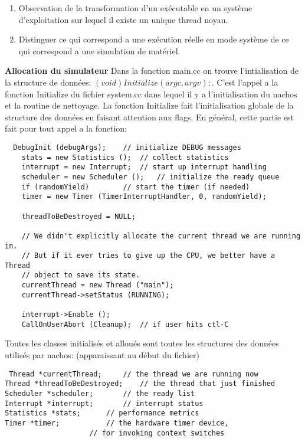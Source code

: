 \documentclass[a4paper,10pt]{article}
\begin{document}
\begin{enumerate}
 \item Observation de la transformation d'un exécutable en un système
d'exploitation sur lequel il existe un unique thread noyau.

 \item Distinguer ce qui correspond a une exécution réelle en mode système
de ce qui correspond a une simulation de matériel.
\end{enumerate}


\textbf{Allocation du simulateur} Dans la fonction main.cc on trouve
l'intialisation de la structure de données: $ (void) Initialize (argc, argv);$.
C'est l'appel a la fonction Initialize du fichier system.cc dans lequel
il y a l'initialisation du nachos et la routine de nettoyage. La fonction
Initialize fait l'initialisation globale de la structure des données 
en faisant attention aux flags.
En général, cette partie est fait pour tout appel a la fonction:

\begin{lstlisting}
  DebugInit (debugArgs);	// initialize DEBUG messages
    stats = new Statistics ();	// collect statistics
    interrupt = new Interrupt;	// start up interrupt handling
    scheduler = new Scheduler ();	// initialize the ready queue
    if (randomYield)		// start the timer (if needed)
	timer = new Timer (TimerInterruptHandler, 0, randomYield);

    threadToBeDestroyed = NULL;

    // We didn't explicitly allocate the current thread we are running in.
    // But if it ever tries to give up the CPU, we better have a Thread
    // object to save its state. 
    currentThread = new Thread ("main");
    currentThread->setStatus (RUNNING);

    interrupt->Enable ();
    CallOnUserAbort (Cleanup);	// if user hits ctl-C
\end{lstlisting}

Toutes les classes initialisés et alloués sont toutes les structures des données 
utilisés par nachos: (apparaissant au début du fichier)

\begin{lstlisting}
 Thread *currentThread;		// the thread we are running now
Thread *threadToBeDestroyed;	// the thread that just finished
Scheduler *scheduler;		// the ready list
Interrupt *interrupt;		// interrupt status
Statistics *stats;		// performance metrics
Timer *timer;			// the hardware timer device,
					// for invoking context switches
\end{lstlisting}
\end{document}
